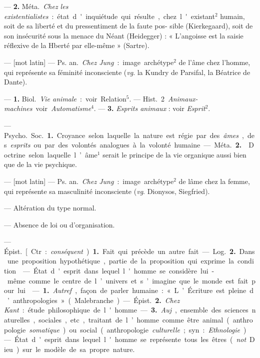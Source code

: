 \begin{itemize}[leftmargin=1cm, label=, itemsep=1pt]
{{{— {\bf 2.} \si{Méta.} {\it Chez les existentialistes} :
état d'inquiétude qui résulte, chez
l'existant$^2$ humain, soit de sa liberté
et du pressentiment de la faute pos-
sible (Kierkegaard), soit de son
insécurité sous la menace du Néant
(Heidegger) : « L'angoisse est la
saisie réflexive de la Hberté par
elle-même » (Sartre).

 — [mot latin] — \si{Ps. an.} {\it Chez
Jung} : image archétype$^2$ de l’âme
chez l’homme, qui représente sa
féminité inconsciente ({\it vg}. la Kundry
de Parsifal, la Béatrice de Dante).

 — {\bf 1.} \si{Biol.} {\it Vie animale} : voir
Relation$^5$. — \si{Hist.} 2 {\it Animaux-machines} voir {\it Automatisme}$^4$. —
 {\bf 3.} {\it Esprits animaux} : voir {\it Esprit}$^2$.

 — \si{Psycho.} \si{Soc.} {\bf 1.} Croyance
selon laquelle la nature est régie par
des {\it âmes}, des {\it esprits} ou par des
volontés analogues à la volonté
humaine.

— \si{Méta.} {\bf 2.}  Doctrine selon laquelle l’âme$^1$ serait le principe de
la vie organique aussi bien que de
la vie psychique.

 — [mot latin] — \si{Ps. an.} {\it Chez
Jung} : image archétype$^2$ de lâme
chez la femme, qui représente sa
masculinité inconsciente ({\it vg}. Dionysos, Siegfried).

 — Altération du type
normal.

 — Absence de loi ou d’organisation.

 — \si{Épist.} [Ctr. : {\it conséquent}). {\bf 1.} Fait qui précède un autre
fait. — \si{Log.} {\bf 2.} Dans une proposition
hypothétique, partie de la proposition qui exprime la condition.

 — État d'esprit
dans lequel l'homme se considère
lui-même comme le centre de l’univers et s’imagine que le monde est
fait pour lui.

 — {\bf 1.} {\it Autref}., façon de
parler humaine : « L’Écriture est
pleine d’anthropologies » (Malebranche).

— \si{Épist.} {\bf 2.} {\it Chez Kant} : étude
philosophique de l'homme. — {\bf 3.}
{\it Auj}., ensemble des sciences naturelles, sociales, etc., traitant de
l’homme comme être animal (anthropologie {\it somatique})
ou social (anthropologie {\it culturelle}; syn. : {\it Ethnologie}).

 — État d'esprit
dans lequel l'homme se représente
tous les êtres ({\it not}. Dieu) sur le
modèle de sa propre nature.

}}}
\end{itemize}

